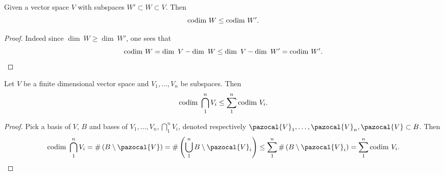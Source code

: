     \begin{lemma}
        Given a vector space $V$ with subspaces $W'\subset W\subset V$. Then 
        $$
            \mathrm{codim}\ W\leq \mathrm{codim}\ W'.
        $$
    \end{lemma}
    \begin{proof}
        Indeed since $\dim \ W\geq \dim \ W'$, one sees that 
        $$
            \mathrm{codim} \ W = \dim \ V - \dim \ W \leq \dim\ V- \dim \ W' = \mathrm{codim}\ W'. 
        $$
    \end{proof}
    \begin{lemma}\label{CodimensionOfIntersectionIsBoundedBySumOfCodimensions}
        Let $V$ be a finite dimensional vector space and $V_1,\dots,V_n$ be subspaces. Then 
        $$\mathrm{codim} \ \bigcap_1^n V_i \leq \sum_1^n \mathrm{codim} \ V_i.$$
    \end{lemma}
    \begin{proof}
        Pick a basis of $V$, $B$ and bases of $V_1,\dots,V_n,\bigcap_1^n V_i$, denoted respectively $\pazocal{V}_1,\dots,\pazocal{V}_n,\pazocal{V}\subset B$. Then 
        $$\codim\ \bigcap_1^n V_i = \#\left( B\setminus \pazocal{V}\right)= \#\left(\bigcup_1^n B\setminus \pazocal{V}_i \right)\leq \sum_1^n \#\left(B\setminus \pazocal{V}_i\right)=\sum_1^n \codim\ V_i.$$
    \end{proof}
    
